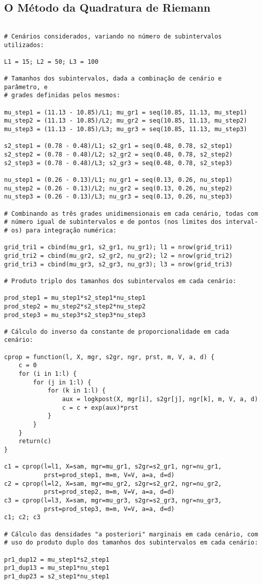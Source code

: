 \documentclass[12pt,reqno,a4paper,oneside]{article}
\begin{document}
\subsection*{O Método da Quadratura de Riemann}

\begin{verbatim}

# Cenários considerados, variando no número de subintervalos utilizados:

L1 = 15; L2 = 50; L3 = 100

# Tamanhos dos subintervalos, dada a combinação de cenário e parâmetro, e
# grades definidas pelos mesmos:

mu_step1 = (11.13 - 10.85)/L1; mu_gr1 = seq(10.85, 11.13, mu_step1)
mu_step2 = (11.13 - 10.85)/L2; mu_gr2 = seq(10.85, 11.13, mu_step2)
mu_step3 = (11.13 - 10.85)/L3; mu_gr3 = seq(10.85, 11.13, mu_step3)

s2_step1 = (0.78 - 0.48)/L1; s2_gr1 = seq(0.48, 0.78, s2_step1)
s2_step2 = (0.78 - 0.48)/L2; s2_gr2 = seq(0.48, 0.78, s2_step2)
s2_step3 = (0.78 - 0.48)/L3; s2_gr3 = seq(0.48, 0.78, s2_step3)

nu_step1 = (0.26 - 0.13)/L1; nu_gr1 = seq(0.13, 0.26, nu_step1)
nu_step2 = (0.26 - 0.13)/L2; nu_gr2 = seq(0.13, 0.26, nu_step2)
nu_step3 = (0.26 - 0.13)/L3; nu_gr3 = seq(0.13, 0.26, nu_step3)

# Combinando as três grades unidimensionais em cada cenário, todas com
# número igual de subintervalos e de pontos (nos limites dos interval-
# os) para integração numérica:

grid_tri1 = cbind(mu_gr1, s2_gr1, nu_gr1); l1 = nrow(grid_tri1)
grid_tri2 = cbind(mu_gr2, s2_gr2, nu_gr2); l2 = nrow(grid_tri2)
grid_tri3 = cbind(mu_gr3, s2_gr3, nu_gr3); l3 = nrow(grid_tri3)

# Produto triplo dos tamanhos dos subintervalos em cada cenário:

prod_step1 = mu_step1*s2_step1*nu_step1
prod_step2 = mu_step2*s2_step2*nu_step2
prod_step3 = mu_step3*s2_step3*nu_step3

# Cálculo do inverso da constante de proporcionalidade em cada cenário:

cprop = function(l, X, mgr, s2gr, ngr, prst, m, V, a, d) {
	c = 0
	for (i in 1:l) {
		for (j in 1:l) {
			for (k in 1:l) {
				aux = logkpost(X, mgr[i], s2gr[j], ngr[k], m, V, a, d)
				c = c + exp(aux)*prst
			}
		}
	}
	return(c)
}

c1 = cprop(l=l1, X=sam, mgr=mu_gr1, s2gr=s2_gr1, ngr=nu_gr1,
		   prst=prod_step1, m=m, V=V, a=a, d=d)
c2 = cprop(l=l2, X=sam, mgr=mu_gr2, s2gr=s2_gr2, ngr=nu_gr2,
		   prst=prod_step2, m=m, V=V, a=a, d=d)
c3 = cprop(l=l3, X=sam, mgr=mu_gr3, s2gr=s2_gr3, ngr=nu_gr3,
		   prst=prod_step3, m=m, V=V, a=a, d=d)
c1; c2; c3

# Cálculo das densidades "a posteriori" marginais em cada cenário, com
# uso do produto duplo dos tamanhos dos subintervalos em cada cenário:

pr1_dup12 = mu_step1*s2_step1
pr1_dup13 = mu_step1*nu_step1
pr1_dup23 = s2_step1*nu_step1
\end{verbatim}
\end{document}
